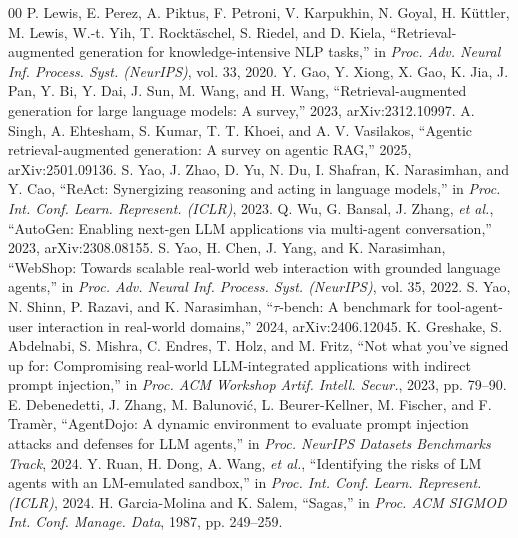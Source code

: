 \documentclass{IEEEtran}
\begin{document}


\begin{thebibliography}{00}
 P. Lewis, E. Perez, A. Piktus, F. Petroni, V. Karpukhin, N. Goyal, H. K\"{u}ttler, M. Lewis, W.-t. Yih, T. Rockt\"{a}schel, S. Riedel, and D. Kiela, ``Retrieval-augmented generation for knowledge-intensive NLP tasks,'' in \textit{Proc. Adv. Neural Inf. Process. Syst. (NeurIPS)}, vol. 33, 2020.
 Y. Gao, Y. Xiong, X. Gao, K. Jia, J. Pan, Y. Bi, Y. Dai, J. Sun, M. Wang, and H. Wang, ``Retrieval-augmented generation for large language models: A survey,'' 2023, arXiv:2312.10997.
 A. Singh, A. Ehtesham, S. Kumar, T. T. Khoei, and A. V. Vasilakos, ``Agentic retrieval-augmented generation: A survey on agentic RAG,'' 2025, arXiv:2501.09136.
 S. Yao, J. Zhao, D. Yu, N. Du, I. Shafran, K. Narasimhan, and Y. Cao, ``ReAct: Synergizing reasoning and acting in language models,'' in \textit{Proc. Int. Conf. Learn. Represent. (ICLR)}, 2023.
 Q. Wu, G. Bansal, J. Zhang, \textit{et al.}, ``AutoGen: Enabling next-gen LLM applications via multi-agent conversation,'' 2023, arXiv:2308.08155.
 S. Yao, H. Chen, J. Yang, and K. Narasimhan, ``WebShop: Towards scalable real-world web interaction with grounded language agents,'' in \textit{Proc. Adv. Neural Inf. Process. Syst. (NeurIPS)}, vol. 35, 2022.
 S. Yao, N. Shinn, P. Razavi, and K. Narasimhan, ``$\tau$-bench: A benchmark for tool-agent-user interaction in real-world domains,'' 2024, arXiv:2406.12045.
 K. Greshake, S. Abdelnabi, S. Mishra, C. Endres, T. Holz, and M. Fritz, ``Not what you've signed up for: Compromising real-world LLM-integrated applications with indirect prompt injection,'' in \textit{Proc. ACM Workshop Artif. Intell. Secur.}, 2023, pp. 79--90.
 E. Debenedetti, J. Zhang, M. Balunovi\'{c}, L. Beurer-Kellner, M. Fischer, and F. Tram\`{e}r, ``AgentDojo: A dynamic environment to evaluate prompt injection attacks and defenses for LLM agents,'' in \textit{Proc. NeurIPS Datasets Benchmarks Track}, 2024.
 Y. Ruan, H. Dong, A. Wang, \textit{et al.}, ``Identifying the risks of LM agents with an LM-emulated sandbox,'' in \textit{Proc. Int. Conf. Learn. Represent. (ICLR)}, 2024.
 H. Garcia-Molina and K. Salem, ``Sagas,'' in \textit{Proc. ACM SIGMOD Int. Conf. Manage. Data}, 1987, pp. 249--259.

\end{thebibliography}
\end{document}
